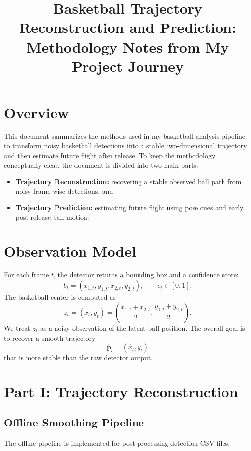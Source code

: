 \documentclass[11pt]{article}
\title{Basketball Trajectory Reconstruction and Prediction: Methodology Notes from My Project Journey}
\author{}
\date{}
\begin{document}
\maketitle

\section{Overview}
This document summarizes the methods used in my basketball analysis pipeline to transform noisy basketball detections into a stable two-dimensional trajectory and then estimate future flight after release. To keep the methodology conceptually clear, the document is divided into two main parts:
\begin{itemize}
    \item \textbf{Trajectory Reconstruction:} recovering a stable observed ball path from noisy frame-wise detections, and
    \item \textbf{Trajectory Prediction:} estimating future flight using pose cues and early post-release ball motion.
\end{itemize}

\section{Observation Model}
For each frame $t$, the detector returns a bounding box and a confidence score:
\begin{equation}
    b_t = (x_{1,t}, y_{1,t}, x_{2,t}, y_{2,t}), \qquad c_t \in [0,1].
\end{equation}
The basketball center is computed as
\begin{equation}
    z_t = (x_t, y_t) =
    \left(
        \frac{x_{1,t} + x_{2,t}}{2},
        \frac{y_{1,t} + y_{2,t}}{2}
    \right).
\end{equation}
We treat $z_t$ as a noisy observation of the latent ball position. The overall goal is to recover a smooth trajectory
\begin{equation}
    \hat{\bm{p}}_t = (\hat{x}_t, \hat{y}_t)
\end{equation}
that is more stable than the raw detector output.

\section{Part I: Trajectory Reconstruction}
\subsection{Offline Smoothing Pipeline}
The offline pipeline is implemented for post-processing detection CSV files.
\end{document}
